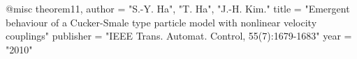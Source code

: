 @misc{ theorem11,
       author = "S.-Y. Ha", "T. Ha", "J.-H. Kim."
       title = "Emergent behaviour of a Cucker-Smale type particle model with nonlinear velocity couplings"
       publisher = "IEEE Trans. Automat. Control, 55(7):1679-1683"
       year = "2010" }